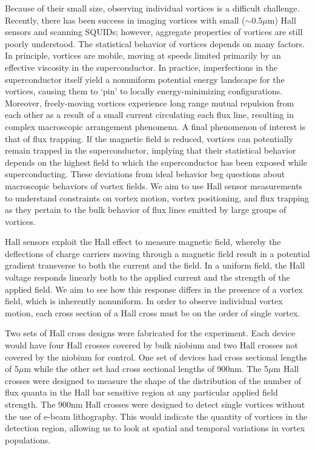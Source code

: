 \documentclass[twocolumn,aps,prl]{revtex4-1} %
\begin{document}
Because of their small size, observing individual vortices is a difficult challenge. Recently, there has been success in imaging vortices with small ($\sim 0.5\mu$m) Hall sensors and scanning SQUIDs; however, aggregate properties of vortices are still poorly understood. \cite{SQUID} The statistical behavior of vortices depends on many factors. In principle, vortices are mobile, moving at speeds limited primarily by an effective viscosity in the superconductor. \cite{VortexMotion_1} In practice, imperfections in the superconductor itself yield a nonuniform potential energy landscape for the vortices, causing them to `pin' to locally energy-minimizing configurations. Moreover, freely-moving vortices experience long range mutual repulsion from each other as a result of a small current circulating each flux line, resulting in complex macroscopic arrangement phenomena. \cite{VortexInteraction_1} A final phenomenon of interest is that of flux trapping. If the magnetic field is reduced, vortices can potentially remain trapped in the superconductor, implying that their statistical behavior depends on the highest field to which the superconductor has been exposed while superconducting. These deviations from ideal behavior beg questions about macroscopic behaviors of vortex fields. We aim to use Hall sensor measurements to understand constraints on vortex motion, vortex positioning, and flux trapping as they pertain to the bulk behavior of flux lines emitted by large groups of vortices.


Hall sensors exploit the Hall effect to measure magnetic field, whereby the deflections of charge carriers moving through a magnetic field result in a potential gradient transverse to both the current and the field. In a uniform field, the Hall voltage responds linearly both to the applied current and the strength of the applied field. We aim to see how this response differs in the presence of a vortex field, which is inherently nonuniform. In order to observe individual vortex motion, each cross section of a Hall cross must be on the order of single vortex. 

Two sets of Hall cross designs were fabricated for the experiment. Each device would have four Hall crosses covered by bulk niobium and two Hall crosses not covered by the niobium for control. One set of devices had cross sectional lengths of 5$\mu$m while the other set had cross sectional lengths of 900nm. The 5$\mu$m Hall crosses were designed to measure the shape of the distribution of the number of flux quanta in the Hall bar sensitive region at any particular applied field strength. The 900nm Hall crosses were designed to detect single vortices without the use of e-beam lithography. This would indicate the quantity of vortices in the detection region, allowing us to look at spatial and temporal variations in vortex populations.
\end{document}
